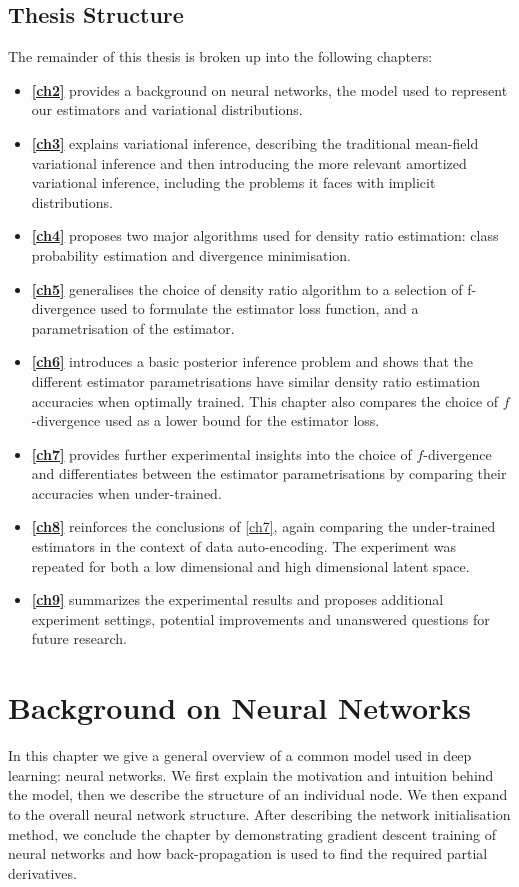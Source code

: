 \documentclass[honours,12pt]{unswthesis}
\numberwithin{equation}{section}
\theoremstyle{definition}
\begin{document}
\section{Thesis Structure}
The remainder of this thesis is broken up into the following chapters:
\begin{itemize}
\item \textbf{\autoref{ch2}} provides a background on neural networks, the model used to represent our estimators and variational distributions.
\item \textbf{\autoref{ch3}} explains variational inference, describing the traditional mean-field variational inference and then introducing the more relevant amortized variational inference, including the problems it faces with implicit distributions.
\item \textbf{\autoref{ch4}} proposes two major algorithms used for density ratio estimation: class probability estimation and divergence minimisation.
\item \textbf{\autoref{ch5}} generalises the choice of density ratio algorithm to a selection of f-divergence used to formulate the estimator loss function, and a parametrisation of the estimator.
\item \textbf{\autoref{ch6}} introduces a basic posterior inference problem and shows that the different estimator parametrisations have similar density ratio estimation accuracies when optimally trained. This chapter also compares the choice of $f$-divergence used as a lower bound for the estimator loss.
\item \textbf{\autoref{ch7}} provides further experimental insights into the choice of $f$-divergence and differentiates between the estimator parametrisations by comparing their accuracies when under-trained.
\item \textbf{\autoref{ch8}} reinforces the conclusions of \autoref{ch7}, again comparing the under-trained estimators in the context of data auto-encoding. The experiment was repeated for both a low dimensional and high dimensional latent space.
\item \textbf{\autoref{ch9}} summarizes the experimental results and proposes additional experiment settings, potential improvements and unanswered questions for future research.
\end{itemize}



\chapter{Background on Neural Networks}\label{ch2}
In this chapter we give a general overview of a common model used in deep learning: neural networks. We first explain the motivation and intuition behind the model, then we describe the structure of an individual node. We then expand to the overall neural network structure. After describing the network initialisation method, we conclude the chapter by demonstrating gradient descent training of neural networks and how back-propagation is used to find the required partial derivatives.
\end{document}
